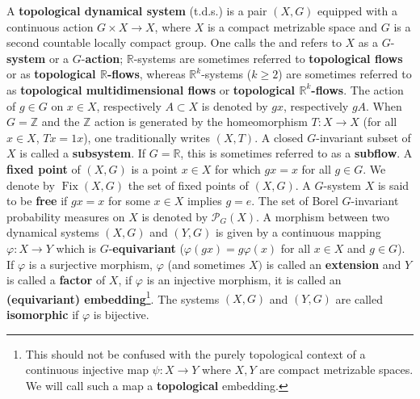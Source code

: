 \documentclass[11pt]{article}
\theoremstyle{plain}
\theoremstyle{definition}
\newtheorem{rem}[thm]{Remark}
\DeclareMathOperator{\Fix}{Fix}
\def\R{\mathbb{R}}
\def\Z{\mathbb{Z}}
\numberwithin{figure}{section}
\begin{document}
A \textbf{topological dynamical system} (t.d.s.) is a pair $(X,G)$ equipped with a continuous action $G\times X\rightarrow X$, where $X$ is a compact metrizable space and $G$ is a second countable locally compact group. One calls the and refers to $X$ as a $G$-\textbf{system} or a $G$-\textbf{action}; $\R$-systems are sometimes referred to \textbf{topological flows} or as \textbf{topological $\R$-flows}, whereas $\R^k$-systems ($k\geq 2$) are sometimes referred to as \textbf{topological multidimensional flows} or \textbf{topological $\R^k$-flows}. The action of $g\in G$ on $x\in X$, respectively $A\subset X$ is denoted by $gx$, respectively $gA$. 
When $G=\Z$ and the $\Z$ action is generated by the homeomorphism $T:X\rightarrow X$ (for all $x\in X$, $Tx=1 x$), one traditionally writes $(X,T)$. 
A closed $G$-invariant subset of $X$ is called a \textbf{subsystem}. If $G=\R$, this is sometimes referred to as a \textbf{subflow}. A \textbf{fixed point} of $(X,G)$ is a point $x\in X$ for which $gx=x$ for all $g\in G$. We denote by  $\Fix(X,G)$ the set of fixed points of $(X,G)$.  A $G$-system $X$ is said to
be \textbf{free} if $gx=x$ for some $x\in X$ implies $g=e$. The  set of Borel $G$-invariant probability measures on $X$ is denoted by $\mathcal{P}_{G}(X)$.
A morphism between
two dynamical systems $(X,G)$ and $(Y,G)$ is given by a continuous
mapping $\varphi:X\rightarrow Y$ which is $G$-\textbf{equivariant}
($\varphi(gx)=g\varphi(x)$ for all $x\in X$ and $g\in G$). If $\varphi$
is a surjective morphism, $\varphi$ (and sometimes $X)$ is called
an \textbf{extension} and $Y$ is called a \textbf{factor} of $X$,
if $\varphi$ is an injective morphism, it is called an \textbf{(equivariant) embedding}\footnote{This should not be confused with the purely topological context of a continuous injective map $\psi:X\rightarrow Y$ where $X,Y$ are compact metrizable spaces. We will call such a map a \textbf{topological} embedding.}.
The systems $(X,G)$ and $(Y,G)$ are called \textbf{isomorphic} if
$\varphi$ is bijective. 

\end{document}
